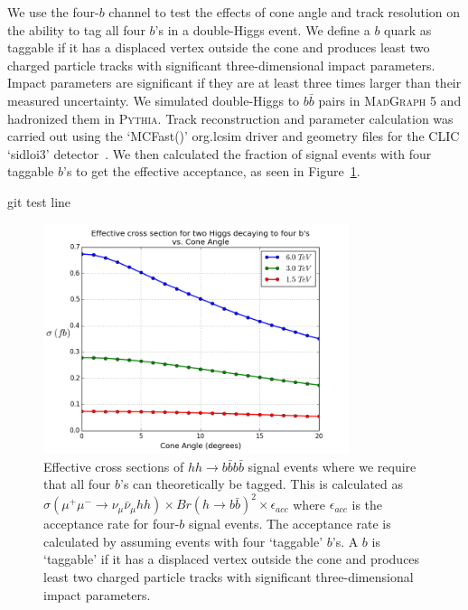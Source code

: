 \documentclass[12pt]{article}
\begin{document}
We use the four-$b$ channel to test the effects of cone angle and track resolution on the ability to tag all four $b$'s in a double-Higgs event. We define a $b$ quark as taggable if it has a displaced vertex outside the cone and produces least two charged particle tracks with significant three-dimensional impact parameters. Impact parameters are significant if they are at least three times larger than their measured uncertainty. We simulated double-Higgs to $b\bar{b}$ pairs in \textsc{MadGraph 5} and hadronized them in \textsc{Pythia}. Track reconstruction and parameter calculation was carried out using the `MCFast()' org.lcsim driver and geometry files for the CLIC `sidloi3' detector~\cite{sidloi3}. We then calculated the fraction of signal events with four taggable $b$'s to get the effective acceptance, as seen in Figure~\ref{fig:cone-xsects}.

git test line

\begin{figure}
	\centering
	\includegraphics[width=0.8\textwidth]{cone_xsects}
	\caption{Effective cross sections of $hh\rightarrow b\bar{b}b\bar{b}$ signal events where we require that all four $b$'s can theoretically be tagged. This is calculated as $\sigma(\mu^+\mu^-\rightarrow \nu_\mu \bar{\nu}_\mu h h) \times Br{(h\rightarrow b\bar{b})}^2 \times \epsilon_{acc}$ where $\epsilon_{acc}$ is the acceptance rate for four-$b$ signal events. The acceptance rate is calculated by assuming events with four `taggable' $b$'s. A $b$ is `taggable' if it has a displaced vertex outside the cone and produces least two charged particle tracks with significant three-dimensional impact parameters.}\label{fig:cone-xsects}
\end{figure}

\end{document}
